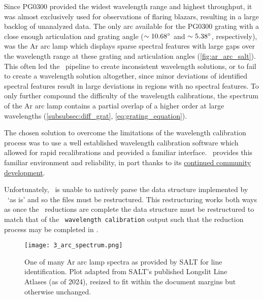 Since PG$0300$ provided the widest wavelength range and highest throughput, it was almost exclusively used for observations of flaring blazars, resulting in a large backlog of unanalyzed data. The only arc available for the PG$0300$ grating with a close enough articulation and grating angle ($\sim 10.68\hbox{$^\circ$}$ and $\sim 5.38\hbox{$^\circ$}$, respectively), was the \gls{Ar} arc lamp which displays sparse spectral features with large gaps over the wavelength range at these grating and articulation angles (\autoref{fig:ar_arc_salt}). This often led the \polsalt\ pipeline to create inconsistent wavelength solutions, or to fail to create a wavelength solution altogether, since minor deviations of identified spectral features result in large deviations in regions with no spectral features. To only further compound the difficulty of the wavelength calibrations, the spectrum of the \gls{Ar} arc lamp contains a partial overlap of a higher order at large wavelengths (\autoref{subsubsec:diff_grat}, \autoref{eq:grating_equation}).

The chosen solution to overcome the limitations of the wavelength calibration process was to use a well established wavelength calibration software which allowed for rapid recalibrations and provided a familiar interface. \iraf\ provides this familiar environment and reliability, in part thanks to its \href{https://github.com/iraf-community/iraf}{continued community development}.

Unfortunately, \iraf\ is unable to natively parse the data structure implemented by \polsalt\ `as is' and so the files must be restructured. This restructuring works both ways as once the \iraf\ reductions are complete the data structure must be restructured to match that of the \polsalt\ \texttt{wavelength calibration} output such that the reduction process may be completed in \polsalt.

\begin{figure}[t]
    \centering
    \texttt{[image: 3\_arc\_spectrum.png]}
    \caption{One of many \gls{Ar} arc lamp spectra as provided by \gls{SALT} for line identification. Plot adapted from \gls{SALT}'s published Longslit Line Atlases (as of 2024), resized to fit within the document margins but otherwise unchanged.\protect\footnotemark}
    \label{fig:ar_arc_salt}
\end{figure}

